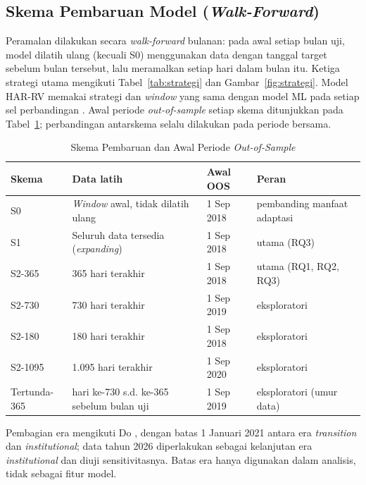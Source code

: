 \subsection{Skema Pembaruan Model (\textit{Walk-Forward})}
Peramalan dilakukan secara \textit{walk-forward} bulanan: pada awal setiap
bulan uji, model dilatih ulang (kecuali S0) menggunakan data dengan tanggal
target sebelum bulan tersebut, lalu meramalkan setiap hari dalam bulan itu.
Ketiga strategi utama mengikuti Tabel~\ref{tab:strategi} dan
Gambar~\ref{fig:strategi}. Model HAR-RV memakai strategi dan \textit{window}
yang sama dengan model ML pada setiap sel perbandingan \cite{chassot2026}.
Awal periode \textit{out-of-sample} setiap skema ditunjukkan pada
Tabel~\ref{tab:oos}; perbandingan antarskema selalu dilakukan pada periode
bersama.

\begin{table}[htbp]
  \caption{Skema Pembaruan dan Awal Periode \textit{Out-of-Sample}}
  \label{tab:oos}
  \centering
  \begingroup
  \small
  \begin{tabular}{|l|p{}|l|p{}|}
    \hline
    \textbf{Skema} & \textbf{Data latih} & \textbf{Awal OOS} &
    \textbf{Peran} \\
    \hline
    S0 & \textit{Window} awal, tidak dilatih ulang & 1 Sep 2018 &
    pembanding manfaat adaptasi \\
    \hline
    S1 & Seluruh data tersedia (\textit{expanding}) & 1 Sep 2018 &
    utama (RQ3) \\
    \hline
    S2-365 & 365 hari terakhir & 1 Sep 2018 & utama (RQ1, RQ2, RQ3) \\
    \hline
    S2-730 & 730 hari terakhir & 1 Sep 2019 & eksploratori \\
    \hline
    S2-180 & 180 hari terakhir & 1 Sep 2018 & eksploratori \\
    \hline
    S2-1095 & 1.095 hari terakhir & 1 Sep 2020 & eksploratori \\
    \hline
    Tertunda-365 & hari ke-730 s.d. ke-365 sebelum bulan uji & 1 Sep 2019 &
    eksploratori (umur data) \\
    \hline
  \end{tabular}
  \endgroup
\end{table}

Pembagian era mengikuti Do \cite{do2026}, dengan batas 1 Januari 2021 antara
era \textit{transition} dan \textit{institutional}; data tahun 2026
diperlakukan sebagai kelanjutan era \textit{institutional} dan diuji
sensitivitasnya. Batas era hanya digunakan dalam analisis, tidak sebagai fitur
model.

